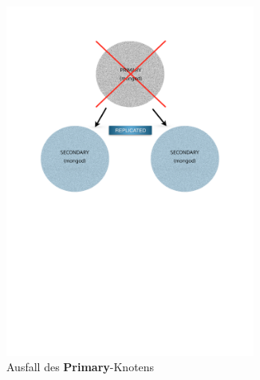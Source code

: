 \begin{figure}[H]
\begin{subfigure}[t]{0.49\textwidth}
      \label{img:createReplicaSet}
   \end{subfigure}\hfill%
   \begin{subfigure}[t]{0.49\textwidth}\vspace{0pt}
   \centering
      \includegraphics[trim = 28mm 139mm 28mm 29mm, clip, width=0.9\textwidth]{resources/replicaSet/selectNewPrimary}
     \caption[Ausfall des \textbf{Primary}-Knotens]{Ausfall des \textbf{Primary}-Knotens}
      \label{img:selectNewPrimary}
   \end{subfigure}\\[5pt]%
   \centering
   \begin{subfigure}[t]{0.49\textwidth}\vspace{0pt}
   \centering

\end{subfigure}
\end{figure}
